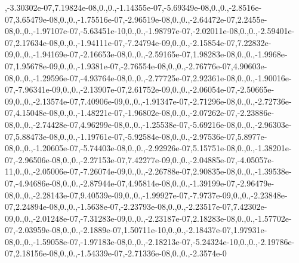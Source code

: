 {,-\/3.\-30302e-\/07,7.\-19824e-\/08,0.,0.,-\/1.\-14355e-\/07,-\/5.\-69349e-\/08,0.,0.,-\/2.\-8516e-\/07,3.\-65479e-\/08,0.,0.,-\/1.\-75516e-\/07,-\/2.\-96519e-\/08,0.,0.,-\/2.\-64472e-\/07,2.\-2455e-\/08,0.,0.,-\/1.\-97107e-\/07,-\/5.\-63451e-\/10,0.,0.,-\/1.\-98797e-\/07,-\/2.\-02011e-\/08,0.,0.,-\/2.\-59401e-\/07,2.\-17634e-\/08,0.,0.,-\/1.\-94111e-\/07,-\/7.\-24794e-\/09,0.,0.,-\/2.\-15854e-\/07,7.\-22832e-\/09,0.,0.,-\/1.\-94169e-\/07,-\/2.\-16653e-\/08,0.,0.,-\/2.\-59165e-\/07,1.\-98283e-\/08,0.,0.,-\/1.\-9968e-\/07,1.\-95678e-\/09,0.,0.,-\/1.\-9381e-\/07,-\/2.\-76554e-\/08,0.,0.,-\/2.\-76776e-\/07,4.\-90603e-\/08,0.,0.,-\/1.\-29596e-\/07,-\/4.\-93764e-\/08,0.,0.,-\/2.\-77725e-\/07,2.\-92361e-\/08,0.,0.,-\/1.\-90016e-\/07,-\/7.\-96341e-\/09,0.,0.,-\/2.\-13907e-\/07,2.\-61752e-\/09,0.,0.,-\/2.\-06054e-\/07,-\/2.\-50665e-\/09,0.,0.,-\/2.\-13574e-\/07,7.\-40906e-\/09,0.,0.,-\/1.\-91347e-\/07,-\/2.\-71296e-\/08,0.,0.,-\/2.\-72736e-\/07,4.\-15048e-\/08,0.,0.,-\/1.\-48221e-\/07,-\/1.\-96802e-\/08,0.,0.,-\/2.\-07262e-\/07,-\/2.\-23886e-\/08,0.,0.,-\/2.\-74428e-\/07,4.\-96299e-\/08,0.,0.,-\/1.\-25538e-\/07,-\/5.\-69216e-\/08,0.,0.,-\/2.\-96303e-\/07,5.\-88473e-\/08,0.,0.,-\/1.\-19761e-\/07,-\/5.\-92584e-\/08,0.,0.,-\/2.\-97536e-\/07,5.\-8977e-\/08,0.,0.,-\/1.\-20605e-\/07,-\/5.\-74403e-\/08,0.,0.,-\/2.\-92926e-\/07,5.\-15751e-\/08,0.,0.,-\/1.\-38201e-\/07,-\/2.\-96506e-\/08,0.,0.,-\/2.\-27153e-\/07,7.\-42277e-\/09,0.,0.,-\/2.\-04885e-\/07,-\/4.\-05057e-\/11,0.,0.,-\/2.\-05006e-\/07,-\/7.\-26074e-\/09,0.,0.,-\/2.\-26788e-\/07,2.\-90835e-\/08,0.,0.,-\/1.\-39538e-\/07,-\/4.\-94686e-\/08,0.,0.,-\/2.\-87944e-\/07,4.\-95814e-\/08,0.,0.,-\/1.\-39199e-\/07,-\/2.\-96479e-\/08,0.,0.,-\/2.\-28143e-\/07,9.\-40539e-\/09,0.,0.,-\/1.\-99927e-\/07,-\/7.\-9737e-\/09,0.,0.,-\/2.\-23848e-\/07,2.\-24894e-\/08,0.,0.,-\/1.\-5638e-\/07,-\/2.\-23793e-\/08,0.,0.,-\/2.\-23517e-\/07,7.\-42302e-\/09,0.,0.,-\/2.\-01248e-\/07,-\/7.\-31283e-\/09,0.,0.,-\/2.\-23187e-\/07,2.\-18283e-\/08,0.,0.,-\/1.\-57702e-\/07,-\/2.\-03959e-\/08,0.,0.,-\/2.\-1889e-\/07,1.\-50711e-\/10,0.,0.,-\/2.\-18437e-\/07,1.\-97931e-\/08,0.,0.,-\/1.\-59058e-\/07,-\/1.\-97183e-\/08,0.,0.,-\/2.\-18213e-\/07,-\/5.\-24324e-\/10,0.,0.,-\/2.\-19786e-\/07,2.\-18156e-\/08,0.,0.,-\/1.\-54339e-\/07,-\/2.\-71336e-\/08,0.,0.,-\/2.\-3574e-\/0}
